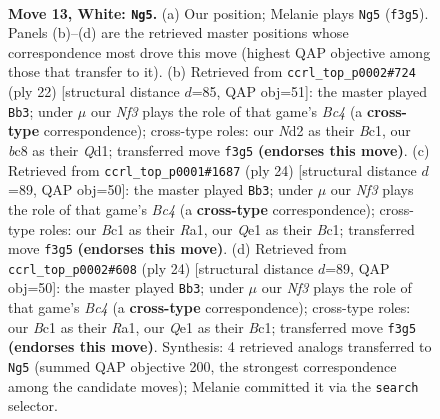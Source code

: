 \documentclass[11pt]{article}
\begin{document}
\clearpage

\begin{figure}[p]\centering
\begin{subfigure}{0.46\textwidth}\centering
\resizebox{\linewidth}{!}{%
\newchessgame
\chessboard[
  setfen={rnbq1rk1/4bp2/4pnp1/p1p4p/1p1p3P/1P1P1NPB/P1PNPP2/R1B1QRK1 w - - 0 13},
  showmover=false,
  pgfstyle=straightmove, color=movearrow, markmove={f3-g5}
]}
\caption{}
\end{subfigure}\hfill
\begin{subfigure}{0.46\textwidth}\centering
\resizebox{\linewidth}{!}{%
\newchessgame
\chessboard[
  setfen={r1bq1rk1/1p3pbp/p1nppnp1/2p5/P1B1P3/2PPNN2/1P3PPP/R1BQR1K1 w - - 0 12},
  showmover=false,
  pgfstyle=straightmove, color=movearrow, markmove={c4-b3}
]}
\caption{}
\end{subfigure}
\\[4pt]
\begin{subfigure}{0.46\textwidth}\centering
\resizebox{\linewidth}{!}{%
\newchessgame
\chessboard[
  setfen={1rbq1rk1/1p3pbp/p1nppnp1/2p5/P1B1P3/2PPNN1P/1P3PP1/R1BQR1K1 w - - 1 13},
  showmover=false,
  pgfstyle=straightmove, color=movearrow, markmove={c4-b3}
]}
\caption{}
\end{subfigure}\hfill
\begin{subfigure}{0.46\textwidth}\centering
\resizebox{\linewidth}{!}{%
\newchessgame
\chessboard[
  setfen={1rbq1rk1/1p3pbp/p1nppnp1/2p5/P1B1P3/2PPNN1P/1P3PP1/R1BQR1K1 w - - 1 13},
  showmover=false,
  pgfstyle=straightmove, color=movearrow, markmove={c4-b3}
]}
\caption{}
\end{subfigure}
\caption{\textbf{Move 13, White: \texttt{Ng5}.} (a) Our position; Melanie plays \texttt{Ng5} (\texttt{f3g5}). Panels (b)--(d) are the retrieved master positions whose correspondence most drove this move (highest QAP objective among those that transfer to it). (b) Retrieved from \texttt{ccrl\_top\_p0002\#724} (ply 22) [structural distance $d$=85, QAP obj=51]: the master played \texttt{Bb3}; under $\mu$ our \emph{Nf3} plays the role of that game's \emph{Bc4} (a \textbf{cross-type} correspondence); cross-type roles: our \emph{N}d2 as their \emph{B}c1, our \emph{b}c8 as their \emph{Q}d1; transferred move \texttt{f3g5} \textbf{(endorses this move)}. (c) Retrieved from \texttt{ccrl\_top\_p0001\#1687} (ply 24) [structural distance $d$=89, QAP obj=50]: the master played \texttt{Bb3}; under $\mu$ our \emph{Nf3} plays the role of that game's \emph{Bc4} (a \textbf{cross-type} correspondence); cross-type roles: our \emph{B}c1 as their \emph{R}a1, our \emph{Q}e1 as their \emph{B}c1; transferred move \texttt{f3g5} \textbf{(endorses this move)}. (d) Retrieved from \texttt{ccrl\_top\_p0002\#608} (ply 24) [structural distance $d$=89, QAP obj=50]: the master played \texttt{Bb3}; under $\mu$ our \emph{Nf3} plays the role of that game's \emph{Bc4} (a \textbf{cross-type} correspondence); cross-type roles: our \emph{B}c1 as their \emph{R}a1, our \emph{Q}e1 as their \emph{B}c1; transferred move \texttt{f3g5} \textbf{(endorses this move)}. Synthesis: 4 retrieved analogs transferred to \texttt{Ng5} (summed QAP objective 200, the strongest correspondence among the candidate moves); Melanie committed it via the \texttt{search} selector.}

\end{figure}
\end{document}
